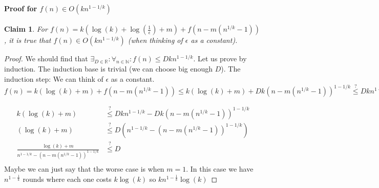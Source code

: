 \documentclass{article}
\theoremstyle{plain}
\newtheorem{claim}{Claim}
\begin{document}
\paragraph{Proof for $f(n) \in O(kn^{1-1/k})$}
\begin{claim} 
For $f(n) = k(\log(k) + \log(\frac{1}{\epsilon}) + m) + f(n - m(n^{1/k} - 1))$, it is true that $f(n) \in O(kn^{1-1/k})$ (when thinking of $\epsilon$ as a constant). \newline
\end{claim}
\begin{proof}
We should find that $ \exists_{D\in\mathbb{R}} : \forall_{n \in \mathbb{N}} : f(n) \leq Dkn^{1-1/k}$. Let us prove by induction. The induction base is trivial (we can choose big enough $D$). The induction step: \newline
We can think of $\epsilon$ as a constant. \newline
$f(n) = k(\log(k) + m) + f(n - m(n^{1/k} - 1)) \leq k(\log(k) + m) + Dk(n - m(n^{1/k} - 1))^{1-1/k} \overset{?}{\leq} Dkn^{1-1/k}$ \newline

\begin{align*}
  k(\log(k) + m) &\overset{?}{\leq} Dkn^{1-1/k} -  Dk(n - m(n^{1/k} - 1))^{1-1/k}\\
  (\log(k) + m) &\overset{?}{\leq} D(n^{1-1/k} -  (n - m(n^{1/k} - 1))^{1-1/k})\\
  \frac{\log(k) + m}{n^{1-1/k} -  (n - m(n^{1/k} - 1))^{1-1/k}} & \overset{?}{\leq} D \\
\end{align*}
\newline
Maybe we can just say that the worse case is when $m = 1$.
In this case we have $n^{1-\frac{1}{k}}$ rounds where each one costs $k\log(k)$ so $kn^{1-\frac{1}{k}}\log(k)$
\end{proof}
\end{document}
